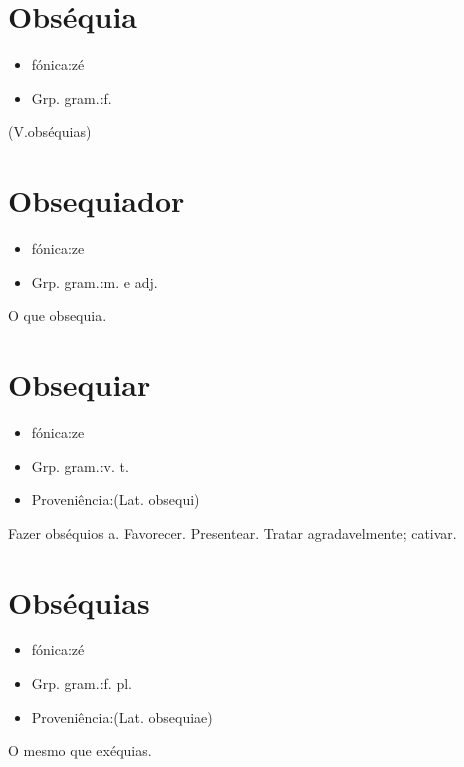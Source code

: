 \section{Obséquia}
\begin{itemize}
\item {fónica:zé}
\end{itemize}
\begin{itemize}
\item {Grp. gram.:f.}
\end{itemize}
(V.obséquias)
\section{Obsequiador}
\begin{itemize}
\item {fónica:ze}
\end{itemize}
\begin{itemize}
\item {Grp. gram.:m.  e  adj.}
\end{itemize}
O que obsequia.
\section{Obsequiar}
\begin{itemize}
\item {fónica:ze}
\end{itemize}
\begin{itemize}
\item {Grp. gram.:v. t.}
\end{itemize}
\begin{itemize}
\item {Proveniência:(Lat. \textunderscore obsequi\textunderscore )}
\end{itemize}
Fazer obséquios a.
Favorecer.
Presentear.
Tratar agradavelmente; cativar.
\section{Obséquias}
\begin{itemize}
\item {fónica:zé}
\end{itemize}
\begin{itemize}
\item {Grp. gram.:f. pl.}
\end{itemize}
\begin{itemize}
\item {Proveniência:(Lat. \textunderscore obsequiae\textunderscore )}
\end{itemize}
O mesmo que exéquias.
